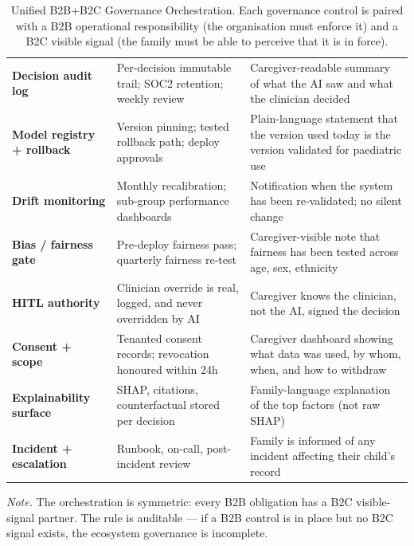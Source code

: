 {
\begin{xltabular}{\textwidth}{@{} >{\raggedright\arraybackslash}p{3.0cm} L L @{}}
\caption[Unified B2B+B2C Governance Orchestration]{Unified B2B+B2C Governance Orchestration. Each governance control is paired with a B2B operational responsibility (the organisation must enforce it) and a B2C visible signal (the family must be able to perceive that it is in force).}\label{tab:appj_orchestration} \\
\toprule
{} &  &  \\
\midrule
\endfirsthead
\endhead
\bottomrule
\endlastfoot
\textbf{Decision audit log}      & Per-decision immutable trail; SOC2 retention; weekly review     & Caregiver-readable summary of what the AI saw and what the clinician decided \\
\textbf{Model registry + rollback} & Version pinning; tested rollback path; deploy approvals          & Plain-language statement that the version used today is the version validated for paediatric use \\
\textbf{Drift monitoring}        & Monthly recalibration; sub-group performance dashboards            & Notification when the system has been re-validated; no silent change \\
\textbf{Bias / fairness gate}    & Pre-deploy fairness pass; quarterly fairness re-test               & Caregiver-visible note that fairness has been tested across age, sex, ethnicity \\
\textbf{HITL authority}          & Clinician override is real, logged, and never overridden by AI     & Caregiver knows the clinician, not the AI, signed the decision \\
\textbf{Consent + scope}         & Tenanted consent records; revocation honoured within 24h          & Caregiver dashboard showing what data was used, by whom, when, and how to withdraw \\
\textbf{Explainability surface}  & SHAP, citations, counterfactual stored per decision                 & Family-language explanation of the top factors (not raw SHAP) \\
\textbf{Incident + escalation}   & Runbook, on-call, post-incident review                              & Family is informed of any incident affecting their child's record \\
\end{xltabular}}
\vspace{0.4em}
\noindent\textit{Note.} The orchestration is symmetric: every B2B obligation has a B2C visible-signal partner. The rule is auditable --- if a B2B control is in place but no B2C signal exists, the ecosystem governance is incomplete.

